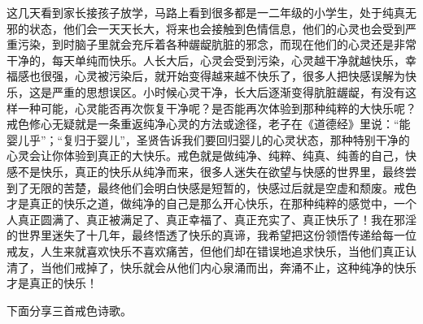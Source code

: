 这几天看到家长接孩子放学，马路上看到很多都是一二年级的小学生，处于纯真无邪的状态，他们会一天天长大，将来也会接触到色情信息，他们的心灵也会受到严重污染，到时脑子里就会充斥着各种龌龊肮脏的邪念，而现在他们的心灵还是非常干净的，每天单纯而快乐。人长大后，心灵会受到污染，心灵越干净就越快乐，幸福感也很强，心灵被污染后，就开始变得越来越不快乐了，很多人把快感误解为快乐，这是严重的思想误区。小时候心灵干净，长大后逐渐变得肮脏龌龊，有没有这样一种可能，心灵能否再次恢复干净呢？是否能再次体验到那种纯粹的大快乐呢？戒色修心无疑就是一条重返纯净心灵的方法或途径，老子在《道德经》里说：“能婴儿乎”；“复归于婴儿”，圣贤告诉我们要回归婴儿的心灵状态，那种特别干净的心灵会让你体验到真正的大快乐。戒色就是做纯净、纯粹、纯真、纯善的自己，快感不是快乐，真正的快乐从纯净而来，很多人迷失在欲望与快感的世界里，最终尝到了无限的苦楚，最终他们会明白快感是短暂的，快感过后就是空虚和颓废。戒色才是真正的快乐之道，做纯净的自己是那么开心快乐，在那种纯粹的感觉中，一个人真正圆满了、真正被满足了、真正幸福了、真正充实了、真正快乐了！我在邪淫的世界里迷失了十几年，最终悟透了快乐的真谛，我希望把这份领悟传递给每一位戒友，人生来就喜欢快乐不喜欢痛苦，但他们却在错误地追求快乐，当他们真正认清了，当他们戒掉了，快乐就会从他们内心泉涌而出，奔涌不止，这种纯净的快乐才是真正的快乐！

下面分享三首戒色诗歌。

